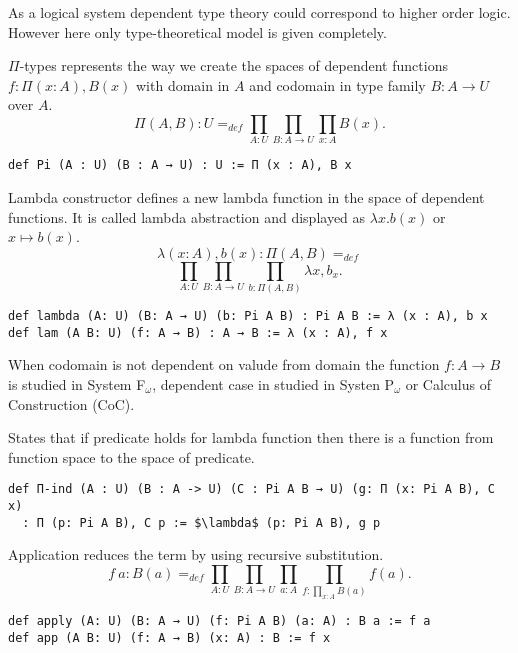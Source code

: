 \documentclass{article}
\begin{document}
As a logical system dependent type theory could correspond to higher order logic.
However here only type-theoretical model is given completely.

\begin{definition}[$\Pi$-Formation]
$\Pi$-types represents the way we create the spaces of
dependent functions $f: \Pi(x:A), B(x)$ with domain
in $A$ and codomain in type family $B : A \rightarrow U$ over $A$.
$$
  \Pi(A,B) : U =_{def} \prod_{A:U}\prod_{B: A \rightarrow U}\prod_{x:A}B(x).
$$
\begin{lstlisting}[mathescape=true]
def Pi (A : U) (B : A → U) : U := Π (x : A), B x
\end{lstlisting}
\end{definition}

\begin{definition}[$\Pi$-Introduction]
Lambda constructor defines a new lambda function in the space of dependent functions.
It is called lambda abstraction and displayed as $\lambda x. b(x)$ or $x \mapsto b(x)$.
$$
  \lambda (x: A), b(x) : \Pi(A,B) =_{def}
$$
$$
  \prod_{A:U}\prod_{B:A \rightarrow U}\prod_{b:\Pi(A,B)}\lambda x, b_x.
$$
\begin{lstlisting}[mathescape=true]
def lambda (A: U) (B: A → U) (b: Pi A B) : Pi A B := λ (x : A), b x
def lam (A B: U) (f: A → B) : A → B := λ (x : A), f x
\end{lstlisting}
\end{definition}

When codomain is not dependent on valude from domain the function $f: A \rightarrow B$
is studied in System F$_\omega$, dependent case in studied
in Systen P$_\omega$ or Calculus of Construction (CoC).

\begin{definition}
States that if predicate holds for lambda function
then there is a function from function space to the space of predicate.
\begin{lstlisting}[mathescape=true]
def П-ind (A : U) (B : A -> U) (C : Pi A B → U) (g: Π (x: Pi A B), C x)
  : П (p: Pi A B), C p := $\lambda$ (p: Pi A B), g p
\end{lstlisting}
\end{definition}

\begin{definition}[$\Pi$-Elimination]
Application reduces the term by using recursive substitution.
$$
   f\ a : B(a) =_{def} \prod_{A:U}\prod_{B: A \rightarrow U}\prod_{a:A}\prod_{f: \prod_{x:A}B(a)}f(a).
$$
\begin{lstlisting}[mathescape=true]
def apply (A: U) (B: A → U) (f: Pi A B) (a: A) : B a := f a
def app (A B: U) (f: A → B) (x: A) : B := f x
\end{lstlisting}
\end{definition}
\end{document}

